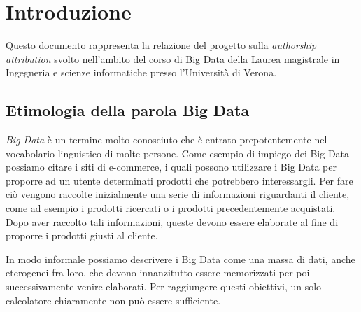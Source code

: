 \documentclass[titlepage]{article}
\begin{document}
\begin{frontespizio}
\NCandidati{}
\Punteggiatura{}
\end{frontespizio}

\tableofcontents
\newpage

\section{Introduzione}
\label{sec:1}
Questo documento rappresenta la relazione del progetto sulla \textit{authorship attribution} svolto nell'ambito del corso di Big Data della Laurea magistrale in Ingegneria e scienze informatiche presso l'Università di Verona.

\subsection{Etimologia della parola Big Data}
\textit{Big Data} è un termine molto conosciuto che è entrato prepotentemente nel vocabolario linguistico di molte persone. Come esempio di impiego dei Big Data possiamo citare i siti di e-commerce, i quali possono utilizzare i Big Data per proporre ad un utente determinati prodotti che potrebbero interessargli. Per fare ciò vengono raccolte inizialmente una serie di informazioni riguardanti il cliente, come ad esempio i prodotti ricercati o i prodotti precedentemente acquistati. Dopo aver raccolto tali informazioni, queste devono essere elaborate al fine di proporre i prodotti giusti al cliente.

In modo informale possiamo descrivere i Big Data come una massa di dati, anche eterogenei fra loro, che devono innanzitutto essere memorizzati per poi successivamente venire elaborati. Per raggiungere questi obiettivi, un solo calcolatore chiaramente non può essere sufficiente.
\end{document}
